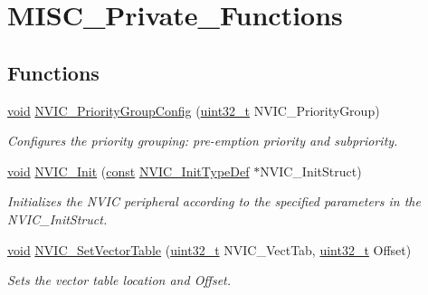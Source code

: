 \hypertarget{group___m_i_s_c___private___functions}{\section{M\-I\-S\-C\-\_\-\-Private\-\_\-\-Functions}
\label{group___m_i_s_c___private___functions}
}
\subsection*{Functions}
\begin{DoxyCompactItemize}
\item 
\hyperlink{group___n_a_m_e_ga18028b8badbf1ea7e704ccac3c488e82}{void} \hyperlink{group___m_i_s_c___private___functions_gadfb1f34f803ce54c976643db8c484442}{N\-V\-I\-C\-\_\-\-Priority\-Group\-Config} (\hyperlink{stdint_8h_a435d1572bf3f880d55459d9805097f62}{uint32\-\_\-t} N\-V\-I\-C\-\_\-\-Priority\-Group)
\begin{DoxyCompactList}\small\item\em Configures the priority grouping\-: pre-\/emption priority and subpriority. \end{DoxyCompactList}\item 
\hyperlink{group___n_a_m_e_ga18028b8badbf1ea7e704ccac3c488e82}{void} \hyperlink{group___m_i_s_c___private___functions_gab5880117b6ec4da4bcc41daa9c85f5fb}{N\-V\-I\-C\-\_\-\-Init} (\hyperlink{group___n_a_m_e_ga7ae6d0e43244213b34de2c2b9aa30da6}{const} \hyperlink{struct_n_v_i_c___init_type_def}{N\-V\-I\-C\-\_\-\-Init\-Type\-Def} $\ast$N\-V\-I\-C\-\_\-\-Init\-Struct)
\begin{DoxyCompactList}\small\item\em Initializes the N\-V\-I\-C peripheral according to the specified parameters in the N\-V\-I\-C\-\_\-\-Init\-Struct. \end{DoxyCompactList}\item 
\hyperlink{group___n_a_m_e_ga18028b8badbf1ea7e704ccac3c488e82}{void} \hyperlink{group___m_i_s_c___private___functions_ga1145208ad70edfc2fab19b8b8ef1b1a1}{N\-V\-I\-C\-\_\-\-Set\-Vector\-Table} (\hyperlink{stdint_8h_a435d1572bf3f880d55459d9805097f62}{uint32\-\_\-t} N\-V\-I\-C\-\_\-\-Vect\-Tab, \hyperlink{stdint_8h_a435d1572bf3f880d55459d9805097f62}{uint32\-\_\-t} Offset)
\begin{DoxyCompactList}\small\item\em Sets the vector table location and Offset. \end{DoxyCompactList}\item 

\end{DoxyCompactItemize}
